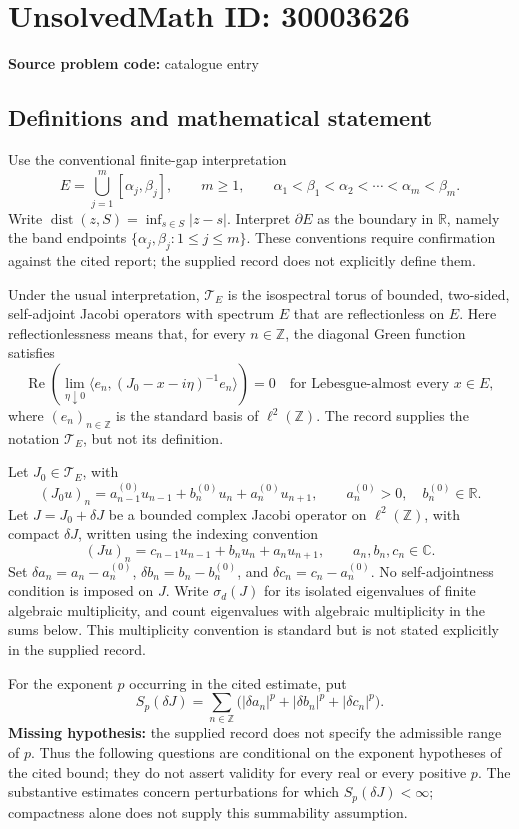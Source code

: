 \documentclass[11pt]{article}
\newcommand{\Z}{\mathbb{Z}}
\newcommand{\R}{\mathbb{R}}
\newcommand{\C}{\mathbb{C}}
\begin{document}
\section*{UnsolvedMath ID: 30003626}
\textbf{Source problem code:} catalogue entry
\subsection{Definitions and mathematical statement}
Use the conventional finite-gap interpretation
\[
E=\bigcup_{j=1}^{m}[\alpha_j,\beta_j],\qquad m\geq1,\qquad \alpha_1<\beta_1<\alpha_2<\cdots<\alpha_m<\beta_m.
\]
Write \(\operatorname{dist}(z,S)=\inf_{s\in S}|z-s|\). Interpret \(\partial E\) as the boundary in \(\R\), namely the band endpoints \(\{\alpha_j,\beta_j:1\leq j\leq m\}\). These conventions require confirmation against the cited report; the supplied record does not explicitly define them.

Under the usual interpretation, \(\mathcal T_E\) is the isospectral torus of bounded, two-sided, self-adjoint Jacobi operators with spectrum \(E\) that are reflectionless on \(E\). Here reflectionlessness means that, for every \(n\in\Z\), the diagonal Green function satisfies
\[
\operatorname{Re}\left(\lim_{\eta\downarrow0}\langle e_n,(J_0-x-i\eta)^{-1}e_n\rangle\right)=0
\quad\text{for Lebesgue-almost every }x\in E,
\]
where \((e_n)_{n\in\Z}\) is the standard basis of \(\ell^2(\Z)\). The record supplies the notation \(\mathcal T_E\), but not its definition.

Let \(J_0\in\mathcal T_E\), with
\[
(J_0u)_n=a^{(0)}_{n-1}u_{n-1}+b^{(0)}_nu_n+a^{(0)}_nu_{n+1},
\qquad a^{(0)}_n>0,\quad b^{(0)}_n\in\R.
\]
Let \(J=J_0+\delta J\) be a bounded complex Jacobi operator on \(\ell^2(\Z)\), with compact \(\delta J\), written using the indexing convention
\[
(Ju)_n=c_{n-1}u_{n-1}+b_nu_n+a_nu_{n+1},
\qquad a_n,b_n,c_n\in\C.
\]
Set \(\delta a_n=a_n-a^{(0)}_n\), \(\delta b_n=b_n-b^{(0)}_n\), and \(\delta c_n=c_n-a^{(0)}_n\). No self-adjointness condition is imposed on \(J\). Write \(\sigma_d(J)\) for its isolated eigenvalues of finite algebraic multiplicity, and count eigenvalues with algebraic multiplicity in the sums below. This multiplicity convention is standard but is not stated explicitly in the supplied record.

For the exponent \(p\) occurring in the cited estimate, put
\[
S_p(\delta J)=\sum_{n\in\Z}\bigl(|\delta a_n|^p+|\delta b_n|^p+|\delta c_n|^p\bigr).
\]
\textbf{Missing hypothesis:} the supplied record does not specify the admissible range of \(p\). Thus the following questions are conditional on the exponent hypotheses of the cited bound; they do not assert validity for every real or every positive \(p\). The substantive estimates concern perturbations for which \(S_p(\delta J)<\infty\); compactness alone does not supply this summability assumption.
\end{document}
